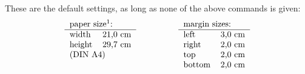 \documentclass[a4paper]{article}
\begin{document}
These are the default settings, as long as none of the above commands is given:
$$\mbox{\begin{tabular}{lr}
\multicolumn{2}{l}{paper size\footnotemark{}:} \\
\hline
width          & 21,0 cm       \\
height           & 29,7 cm       \\
\multicolumn{2}{l}{(DIN A4)}    \\
\\
\end{tabular}} 
\hspace{5em}
\mbox{\begin{tabular}{lr}
\multicolumn{2}{l}{margin sizes:} \\ 
\hline
left           & 3,0 cm \\
right          & 2,0 cm \\
top            & 2,0 cm \\
bottom           & 2,0 cm \\
\end{tabular}}$$

\end{document}
